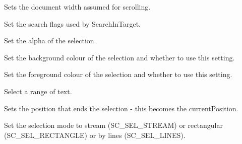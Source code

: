 \label{wxstyledtextctrlsetscrollwidth}


Sets the document width assumed for scrolling.


\label{wxstyledtextctrlsetsearchflags}


Set the search flags used by SearchInTarget.


\label{wxstyledtextctrlsetselalpha}


Set the alpha of the selection.


\label{wxstyledtextctrlsetselbackground}


Set the background colour of the selection and whether to use this setting.


\label{wxstyledtextctrlsetselforeground}


Set the foreground colour of the selection and whether to use this setting.


\label{wxstyledtextctrlsetselection}


Select a range of text.


\label{wxstyledtextctrlsetselectionend}


Sets the position that ends the selection - this becomes the currentPosition.


\label{wxstyledtextctrlsetselectionmode}


Set the selection mode to stream (SC\_SEL\_STREAM) or rectangular (SC\_SEL\_RECTANGLE) or
by lines (SC\_SEL\_LINES).


